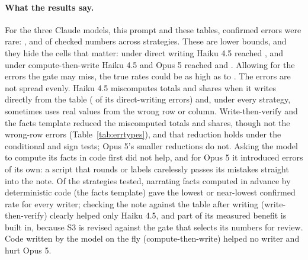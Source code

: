 \documentclass[11pt]{article}
\begin{document}
\paragraph{What the results say.} For the three Claude models, this prompt and these tables, confirmed errors were rare: \ConfOpusAll{}, \ConfSonnetAll{} and \ConfHaikuAll{} of checked numbers across strategies. These are lower bounds, and they hide the cells that matter: under direct writing Haiku 4.5 reached \ConfHaikuOne{}, and under compute-then-write Haiku 4.5 and Opus 5 reached \ConfHaikuTwo{} and \ConfOpusTwo{}. Allowing for the errors the gate may miss, the true rates could be as high as \TrueRateHiSonnet{} to \TrueRateHiHaiku{}. The errors are not spread evenly. Haiku 4.5 miscomputes totals and shares when it writes directly from the table (\ErrValueHaikuOne{} of its \ConfNHaikuOne{} direct-writing errors) and, under every strategy, sometimes uses real values from the wrong row or column. Write-then-verify and the facts template reduced the miscomputed totals and shares, though not the wrong-row errors (Table~\ref{tab:errtypes}), and that reduction holds under the conditional and sign tests; Opus 5's smaller reductions do not. Asking the model to compute its facts in code first did not help, and for Opus 5 it introduced errors of its own: a script that rounds or labels carelessly passes its mistakes straight into the note. Of the strategies tested, narrating facts computed in advance by deterministic code (the facts template) gave the lowest or near-lowest confirmed rate for every writer; checking the note against the table after writing (write-then-verify) clearly helped only Haiku 4.5, and part of its measured benefit is built in, because S3 is revised against the gate that selects its numbers for review. Code written by the model on the fly (compute-then-write) helped no writer and hurt Opus 5.
\end{document}
